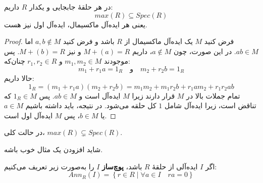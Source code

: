 \begin{frame}
    \begin{theorem}
        در هر حلقهٔ جابجایی و یکدار $R$ داریم:
        \[
            max(R) \subseteq Spec(R)
        \]
        یعنی هر ایده‌آل ماکسیمال، ایده‌آل اول نیز هست.
    \end{theorem}

    \begin{proof}
        فرض کنید $M$ یک ایده‌آل ماکسیمال از $R$ باشد و فرض کنید $a, b \notin M$ اما $ab \in M$.
        در این صورت، چون $a \notin M$، داریم $M + (a) = R$ و نیز $M + (b) = R$.
        پس موجودند $m_1, m_2 \in M$ و $r_1, r_2 \in R$ چنان‌که:
        \[
            m_1 + r_1 a = 1_R \quad \text{و} \quad m_2 + r_2 b = 1_R
        \]
        حالا داریم:
        \[
            1_R = (m_1 + r_1 a)(m_2 + r_2 b) = m_1 m_2 + m_1 r_2 b + r_1 a m_2 + r_1 r_2 ab
        \]
        تمام جملات بالا در $M$ قرار دارند زیرا $M$ ایده‌آل است و $ab \in M$.
        پس $1_R \in M$ که تناقض است، زیرا ایده‌آل شامل $1$ کل حلقه می‌شود.
        در نتیجه، باید داشته باشیم $a \in M$ یا $b \in M$، پس $M$ ایده‌آل اول است.
    \end{proof}

\end{frame}

\begin{frame}

    \begin{remark}
        در حالت کلی، $max(R) \subsetneq Spec(R)$.

        \begin{example}
            شاید افزودن یک مثال خوب باشه.
        \end{example}
    \end{remark}


    \begin{definition}
        اگر $I$ ایده‌آلی از حلقهٔ $R$ باشد، \textbf{پوچ‌ساز} $I$ را به‌صورت زیر تعریف می‌کنیم:
        \[
            Ann_R(I) = \left\{ r \in R \mid \forall a \in I \quad ra = 0 \right\}
        \]
    \end{definition}

\end{frame}


